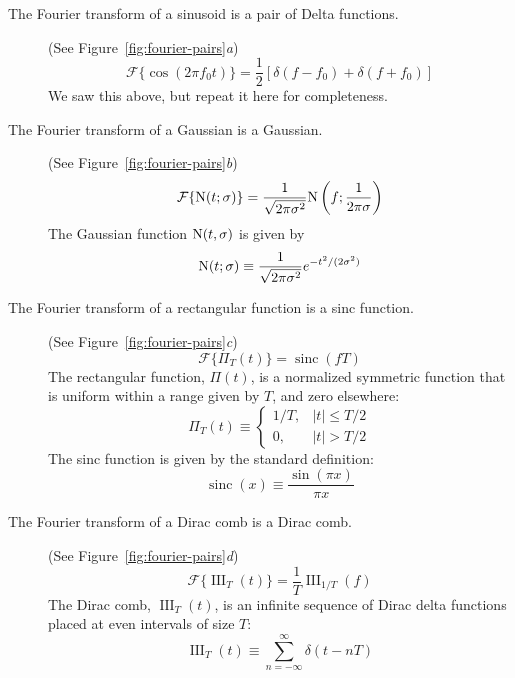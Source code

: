 \documentclass[preprint]{aastex}
\DeclareMathOperator{\sinc}{sinc}
\DeclareMathOperator{\III}{III}
\newcommand{\fig}[1]{Figure~\ref{fig:#1}}
\newcommand{\eqlabel}[1]{\label{eq:#1}}
\begin{document}
\begin{description}
  \item[The Fourier transform of a sinusoid is a pair of Delta functions.]
    (See \fig{fourier-pairs}{\it a})
    \begin{equation}
      \mathcal{F}\{\cos(2\pi f_0 t)\} = \frac{1}{2}\left[\delta(f-f_0) + \delta(f+f_0)\right]
    \end{equation}
    We saw this above, but repeat it here for completeness.

   \item[The Fourier transform of a Gaussian is a Gaussian.]
    (See \fig{fourier-pairs}{\it b})
     \begin{equation}
       \mathcal{F}\{{\rm N}(t; \sigma)\} = \frac{1}{\sqrt{2\pi\sigma^2}}{\rm N}\left(f;\frac{1}{2\pi\sigma}\right)
     \end{equation}
     The Gaussian function ${\rm N}(t, \sigma)$ is given by
     \begin{equation}
       {\rm N}(t; \sigma) \equiv \frac{1}{\sqrt{2\pi\sigma^2}}e^{-t^2/(2\sigma^2)}
     \end{equation}

  \item[The Fourier transform of a rectangular function is a sinc function.]
    (See \fig{fourier-pairs}{\it c})
    \begin{equation}
      \mathcal{F}\{\Pi_T(t)\} = \sinc(f T)
    \end{equation}
    The rectangular function, $\Pi(t)$, is a normalized symmetric function that
    is uniform within a range given by $T$, and zero elsewhere:
    \begin{equation}
      \Pi_T(t)  \equiv \left\{
      \begin{array}{ll}
        1 / T, & |t| \le T / 2 \\
        0,     & |t| > T / 2
      \end{array}
      \right.
    \end{equation}
    The sinc function is given by the standard definition:
    \begin{equation}
      \sinc(x) \equiv \frac{\sin(\pi x)}{\pi x}
    \end{equation}

  \item[The Fourier transform of a Dirac comb is a Dirac comb.]
    (See \fig{fourier-pairs}{\it d})
    \begin{equation}
      \mathcal{F}\{\III_T(t)\} = \frac{1}{T}\III_{1/T}(f)
    \end{equation}
    The Dirac comb, $\III_T(t)$, is an infinite sequence of Dirac delta functions placed at even intervals of size $T$:
    \begin{equation}
      \III_T(t) \equiv \sum_{n=-\infty}^\infty \delta(t - nT)
      \eqlabel{dirac-comb}
    \end{equation}
\end{description}
\end{document}
